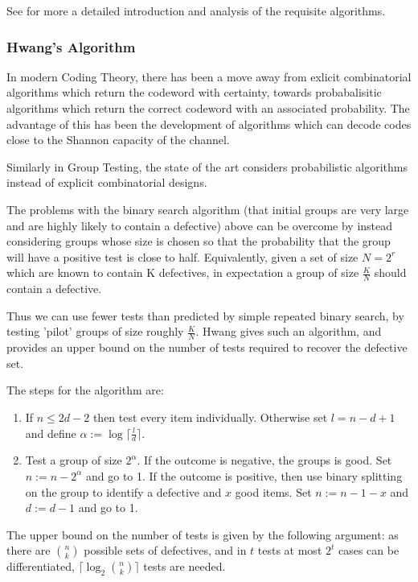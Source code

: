 See \cite{du} for more a detailed introduction and analysis of the requisite algorithms.

\subsubsection*{Hwang's Algorithm}
In modern Coding Theory, there has been a move away from exlicit combinatorial algorithms which return the codeword with certainty, towards probabalisitic algorithms which return the correct codeword with an associated probability. The advantage of this has been the development of algorithms which can decode codes close to the Shannon capacity of the channel.

Similarly in Group Testing, the state of the art considers probabilistic algorithms instead of explicit combinatorial designs. 

The problems with the binary search algorithm (that initial groups are very large and are highly likely to contain a defective) above can be overcome by instead considering groups whose size is chosen so that the probability that the group will have a positive test is close to half. Equivalently, given a set of size \(N=2^r\) which are known to contain K defectives, in expectation a group of size \(\frac{K}{N}\) should contain a defective. 

Thus we can use fewer tests than predicted by simple repeated binary search, by testing 'pilot' groups of size roughly \(\frac{K}{N}\). Hwang \cite{Hwang1972} gives such an algorithm, and provides an upper bound on the number of tests required to recover the defective set.

The steps for the algorithm are:

\begin{enumerate}
\item If \(n \leq 2d-2\) then test every item individually. Otherwise set \(l = n - d + 1\) and define \(\alpha:=\log{\lceil \frac{l}{d}\rceil}\).
\item Test a group of size \(2^\alpha\). If the outcome is negative, the groups is good. Set \(n := n - 2^\alpha \) and go to 1. If the outcome is positive, then use binary splitting on the group to identify a defective and \(x\) good items. Set \(n := n - 1 -x \) and \(d:= d-1\) and go to 1.
\end{enumerate}

The upper bound on the number of tests is given by the following argument: as there are \(n \choose k\) possible sets of defectives, and in \(t\) tests at most \(2^t\) cases can be differentiated, \(\lceil \log_2{n \choose k} \rceil\) tests are needed. 

